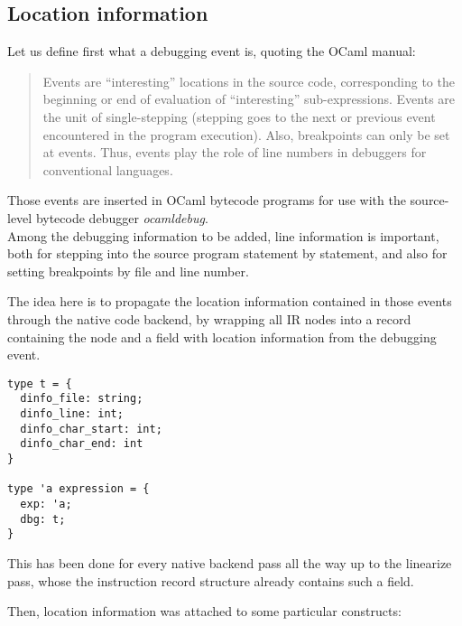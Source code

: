 \subsection{Location information}

Let us define first what a debugging event is, quoting the OCaml manual:

\begin{quotation}
    Events are “interesting” locations in the source code, corresponding to the
    beginning or end of evaluation of “interesting” sub-expressions. Events are
    the unit of single-stepping (stepping goes to the next or previous event
    encountered in the program execution). Also, breakpoints can only be set at
    events. Thus, events play the role of line numbers in debuggers for
    conventional languages. \autocite{events}
\end{quotation}

Those events are inserted in OCaml bytecode programs for use with the source-level bytecode
debugger \textit{ocamldebug}. \\

Among the debugging information to be added, line information is important,
both for stepping into the source program statement by statement,
and also for setting breakpoints by file and line number.

The idea here is to propagate the location information contained in those events
through the native code backend, by wrapping all IR nodes into a record
containing the node and a field with location information from the debugging
event.

\begin{lstlisting}
type t = {
  dinfo_file: string;
  dinfo_line: int;
  dinfo_char_start: int;
  dinfo_char_end: int
}

type 'a expression = {
  exp: 'a;
  dbg: t;
}
\end{lstlisting}

This has been done for every native backend pass all the way up to the linearize
pass, whose the instruction record structure already contains such a field.

Then, location information was attached to some particular constructs:

